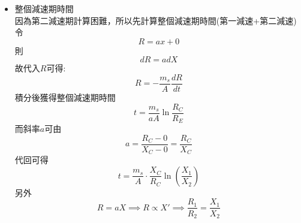 \documentclass[../main.tex]{subfiles}
\begin{document}
\begin{itemize}
\begin{itemize}
\begin{equation}
    \end{equation}
    \item 整個減速期時間\\
    因為第二減速期計算困難，所以先計算整個減速期時間(第一減速+第二減速)\\
    令
    \begin{equation}
      R = ax + 0
    \end{equation}
    則
    \begin{equation}
      dR = a dX
    \end{equation}
    故代入$R$可得:
    \begin{equation}
      R = -\frac{m_s}{A} \frac{dR}{dt}
    \end{equation}
    積分後獲得整個減速期時間
    \begin{equation}
      t = \frac{m_s}{aA} \ln \frac{R_C}{R_E}
    \end{equation}
    而斜率$a$可由
    \begin{equation}
      a = \frac{R_C - 0}{X_C - 0} = \frac{R_C}{X_C}
    \end{equation}
    代回可得
    \begin{equation}
      \boxed{t = \frac{m_s}{A} \cdot \frac{X_C}{R_C}\ln\left(
        \frac{X_1}{X_2}
      \right)}
    \end{equation}
    另外
    \begin{equation}
      R = aX \implies R \propto X' \implies \frac{R_1}{R_2} = \frac{X_1}{X_2}
    \end{equation}
  \end{itemize}
\end{itemize}
\end{document}
